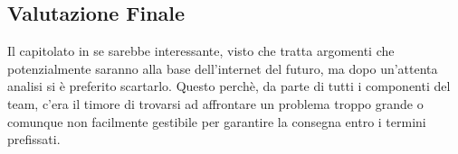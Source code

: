 \subsection{Valutazione Finale}
Il capitolato in se sarebbe interessante, visto che tratta argomenti che potenzialmente saranno alla base dell'internet del futuro, ma dopo un'attenta analisi si è preferito scartarlo. Questo perchè, da parte di tutti i componenti del team, c'era il timore di trovarsi ad affrontare un problema troppo grande o comunque non facilmente gestibile per garantire la consegna entro i termini prefissati.